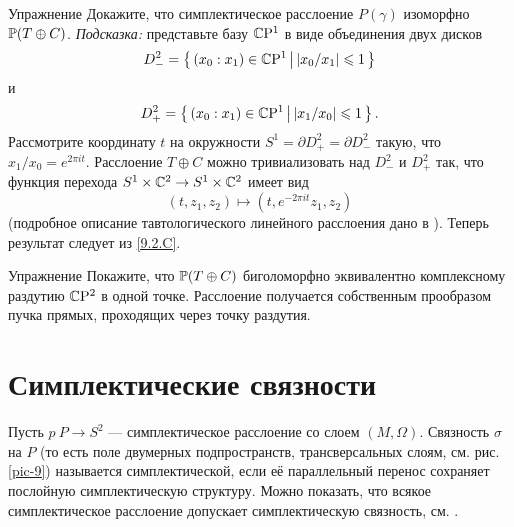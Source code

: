 \begin{ex}{Упражнение}\label{9.2.D}
Докажите, что симплектическое расслоение $P(\gamma)$ изоморфно $\mathbb{P}(T
\oplus C)$. 
\emph{Подсказка:} представьте базу $\mathbb{C}\mathrm{P}^1$ в виде объединения двух дисков 
\[D^2_- = \left\{ \,{(x_0 : x_1 ) \in \mathbb{C}\mathrm{P}^1}\, \middle| \,{ |x_0 /x_1 | \leqslant 1}\, \right\}\]
и
\[D^2_+ = \left\{ \,{(x_0 : x_1 ) \in \mathbb{C}\mathrm{P}^1}\, \middle| \,{|x_1 /x_0 | \leqslant 1}\, \right\}.\]
Рассмотрите координату $t$ на окружности $S^1 = \partial D^2_+ =
\partial D^2_-$ такую, что $x_1 /x_0 = e^{2\pi it}$. 
Расслоение $T \oplus C$ можно тривиализовать над $D^2_-$ и $D^2_+$ так,
что функция перехода $S^1 \times \mathbb{C}^2 \to S^1 \times \mathbb{C}^2$ имеет вид  
\[(t, z_1, z_2 ) \mapsto (t, e^{-2\pi it} z_1, z_2 )\]
(подробное описание тавтологического линейного расслоения дано в
\cite{GH}). 
Теперь результат следует из \ref{9.2.C}.
\end{ex}

\begin{ex}{Упражнение}\label{9.2.E}
Покажите, что $\mathbb{P}(T \oplus C)$ биголоморфно эквивалентно комплексному
раздутию $\mathbb{C}\mathrm{P}^2$ в одной точке. 
Расслоение получается собственным прообразом пучка прямых, проходящих
через точку раздутия. 
\end{ex}

\section{Симплектические связности}

Пусть $p\: P\to S^2$ — симплектическое расслоение со слоем $(M,\Omega)$.
Связность $\sigma$ на $P$ (то есть поле двумерных подпространств,
трансверсальных слоям, см. рис. \ref{pic-9}) называется
симплектической, если её параллельный перенос сохраняет послойную
симплектическую структуру. 
Можно показать, что всякое симплектическое расслоение допускает
симплектическую связность, см. \cite{GLS,MS}. 

